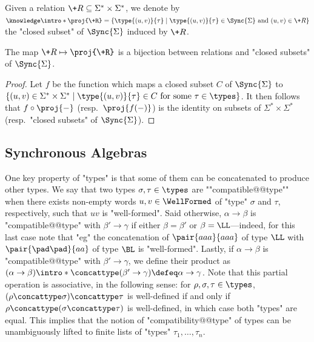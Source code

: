 
Given a relation $\+R \subseteq \Sigma^* \times \Sigma^*$, we denote by
$\AP\intro*\proj{\+R} = \{\type{(u,v)}{\tau} \mid \type{(u,v)}{\tau} \in \Sync{\Sigma} \text{ and } (u,v) \in \+R\}$
the "closed subset" of $\Sync{\Sigma}$ induced by $\+R$.

\begin{fact}
	The map $\+R \mapsto \proj{\+R}$ is a bijection between
	relations and "closed subsets" of $\Sync{\Sigma}$.
\end{fact}

\begin{proof}
	Let $f$ be the function which maps a closed subset $C$ of $\Sync{\Sigma}$ to
	$\{(u,v) \in \Sigma^* \times \Sigma^* \mid \type{(u,v)}{\tau} \in C \text{ for some $\tau \in \types$} \}$. It then follows that $f\circ \proj{-}$ (resp.~$\proj{f(-)}$) is the identity
	on subsets of $\Sigma^* \times \Sigma^*$ (resp.~"closed subsets" of $\Sync{\Sigma}$).
\end{proof}

\subsection{Synchronous Algebras}

One key property of "types" is that some of them can be concatenated to produce other types.
We say that two types $\sigma, \tau \in \types$ are \AP""compatible@@type""
when there exists non-empty words $u,v \in \WellFormed$ of "type" $\sigma$
and $\tau$, respectively, such that $uv$ is "well-formed".
Said otherwise, $\alpha \to \beta$ is "compatible@@type" with $\beta' \to \gamma$
if either $\beta = \beta'$ or $\beta = \LL$---indeed, for this last case
note that "eg" the concatenation of $\pair{aaa}{aaa}$ of type $\LL$ with
$\pair{\pad\pad}{aa}$ of type $\BL$ is "well-formed".
Lastly, if $\alpha\to \beta$ is "compatible@@type" with $\beta'\to\gamma$,
we define their product as \AP $(\alpha\to\beta)\intro*\concattype(\beta'\to\gamma) \defeq \alpha \to \gamma$.
Note that this partial operation is associative, in the following sense: for $\rho,\sigma,\tau \in \types$, $(\rho\concattype\sigma) \concattype \tau$ is well-defined if and only if
$\rho\concattype(\sigma\concattype \tau)$ is well-defined, in which case both "types" are equal.
This implies that the notion of "compatibility@@type" of types can be unambiguously
lifted to finite lists of "types" $\tau_1,\hdots,\tau_n$.

